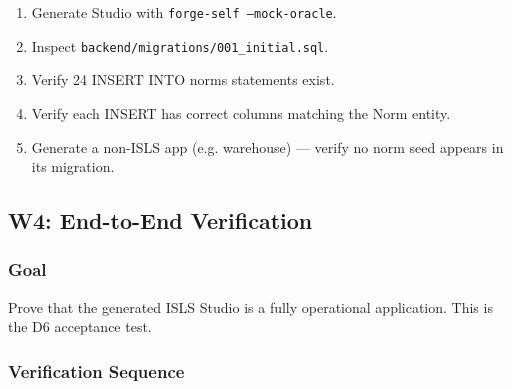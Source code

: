 \documentclass[11pt,a4paper]{article}
\begin{document}
\begin{enumerate}[nosep]
\item Generate Studio with \texttt{forge-self --mock-oracle}.
\item Inspect \texttt{backend/migrations/001\_initial.sql}.
\item Verify 24 INSERT INTO norms statements exist.
\item Verify each INSERT has correct columns matching the Norm entity.
\item Generate a non-ISLS app (e.g. warehouse) --- verify no norm
      seed appears in its migration.
\end{enumerate}


\subsection{W4: End-to-End Verification}
\label{sec:w4}

\subsubsection{Goal}

Prove that the generated ISLS Studio is a fully operational
application. This is the D6 acceptance test.

\subsubsection{Verification Sequence}
\end{document}
